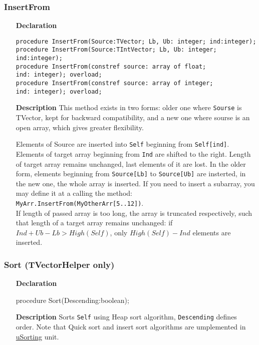 \documentclass[12pt,a4paper,oneside]{report}
\newcommand{\declarationitem}[1]{\textbf{#1}}
\newcommand{\descriptiontitle}[1]{\textbf{#1}}
\newcommand{\code}[1]{\texttt{#1}}
\begin{document}
\subsubsection{InsertFrom}
\begin{itemize}
	\item[\declarationitem{Declaration}\hfill]
	\begin{flushleft}
     \code{procedure InsertFrom(Source:TVector; Lb, Ub: integer; ind:integer);}\\ \vspace{4pt}
     \code{procedure InsertFrom(Source:TIntVector; Lb, Ub: integer; ind:integer);}\\ \vspace{8pt}
     \code{procedure InsertFrom(constref source: array of float; \\ ind: integer); overload;}\\ \vspace{4pt}
     \code{procedure InsertFrom(constref source: array of integer; \\ ind: integer); overload;}
 	\end{flushleft}
	\item[\descriptiontitle{Description}\hfill]
This method exists in two forms: older one where \code{Sourse} is TVector, kept for backward compatibility, and a new one where sourse is an open array, which gives greater flexibility. 

Elements of Source are inserted into \code{Self} beginning from \code{Self[ind]}. Elements of target array beginning from \code{Ind} are shifted to the right. Length of target array remains unchanged, last elements of it are lost. In the older form, elements beginning from \code{Source[Lb]} to \code{Source[Ub]} are insterted, in the new one, the whole array is inserted. If you need to insert a subarray, you may define it at a calling the method:\\ \code{MyArr.InsertFrom(MyOtherArr[5..12])}.\\ If length of passed array is too long, the array is truncated respectively, such that length of a target array remains unchanged: if $Ind + Ub - Lb > High(Self)$, only $High(Self) - Ind$ elements are inserted. 	
\end{itemize}
\subsubsection{Sort (TVectorHelper only)}
\begin{itemize}
	\item[\declarationitem{Declaration}\hfill]
	\begin{flushleft}
     procedure Sort(Descending:boolean);
	\end{flushleft}
	\item[\descriptiontitle{Description}\hfill]
	Sorts \code{Self} using Heap sort algorithm, \code{Descending} defines order. Note that Quick sort and insert sort algorithms are umplemented in \hyperref[usorting]{uSorting} unit.
\end{itemize}
\end{document}
